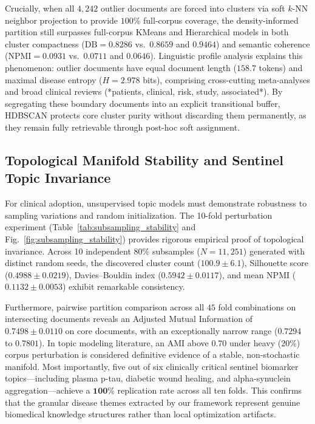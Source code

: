\documentclass[a4paper,10pt,conference]{IEEEtran}
\begin{document}
Crucially, when all $4{,}242$ outlier documents are forced into clusters via soft $k$-NN neighbor projection to provide $100\%$ full-corpus coverage, the density-informed partition still surpasses full-corpus KMeans and Hierarchical models in both cluster compactness ($\text{DB} = 0.8286$ vs.\ $0.8659$ and $0.9464$) and semantic coherence ($\text{NPMI} = 0.0931$ vs.\ $0.0711$ and $0.0646$). Linguistic profile analysis explains this phenomenon: outlier documents have equal document length ($158.7$ tokens) and maximal disease entropy ($H = 2.978$ bits), comprising cross-cutting meta-analyses and broad clinical reviews (*patients, clinical, risk, study, associated*). By segregating these boundary documents into an explicit transitional buffer, HDBSCAN protects core cluster purity without discarding them permanently, as they remain fully retrievable through post-hoc soft assignment.

\subsection{Topological Manifold Stability and Sentinel Topic Invariance}

For clinical adoption, unsupervised topic models must demonstrate robustness to sampling variations and random initialization. The 10-fold perturbation experiment (Table~\ref{tab:subsampling_stability} and Fig.~\ref{fig:subsampling_stability}) provides rigorous empirical proof of topological invariance. Across 10 independent $80\%$ subsamples ($N=11{,}251$) generated with distinct random seeds, the discovered cluster count ($100.9 \pm 6.1$), Silhouette score ($0.4988 \pm 0.0219$), Davies--Bouldin index ($0.5942 \pm 0.0117$), and mean NPMI ($0.1132 \pm 0.0053$) exhibit remarkable consistency.

Furthermore, pairwise partition comparison across all $45$ fold combinations on intersecting documents reveals an Adjusted Mutual Information of $\mathbf{0.7498 \pm 0.0110}$ on core documents, with an exceptionally narrow range ($0.7294$ to $0.7801$). In topic modeling literature, an AMI above $0.70$ under heavy ($20\%$) corpus perturbation is considered definitive evidence of a stable, non-stochastic manifold. Most importantly, five out of six clinically critical sentinel biomarker topics—including plasma p-tau, diabetic wound healing, and alpha-synuclein aggregation—achieve a $\mathbf{100\%}$ replication rate across all ten folds. This confirms that the granular disease themes extracted by our framework represent genuine biomedical knowledge structures rather than local optimization artifacts.
\end{document}
